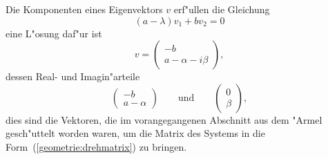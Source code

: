 Die Komponenten eines Eigenvektors $v$ erf"ullen die Gleichung
\[
(a-\lambda)v_1 + bv_2=0
\]
eine L"osung daf"ur ist
\[
v=\begin{pmatrix}
-b\\
a-\alpha-i\beta
\end{pmatrix},
\]
dessen Real- und Imagin"arteile
\[
\begin{pmatrix}
-b\\a-\alpha
\end{pmatrix}
\qquad\text{und}\qquad
\begin{pmatrix}
0\\\beta
\end{pmatrix},
\]
dies sind die Vektoren, die im vorangegangenen Abschnitt aus dem "Armel
gesch"uttelt worden waren, um die Matrix des Systems in die
Form~(\ref{geometrie:drehmatrix}) zu bringen.

